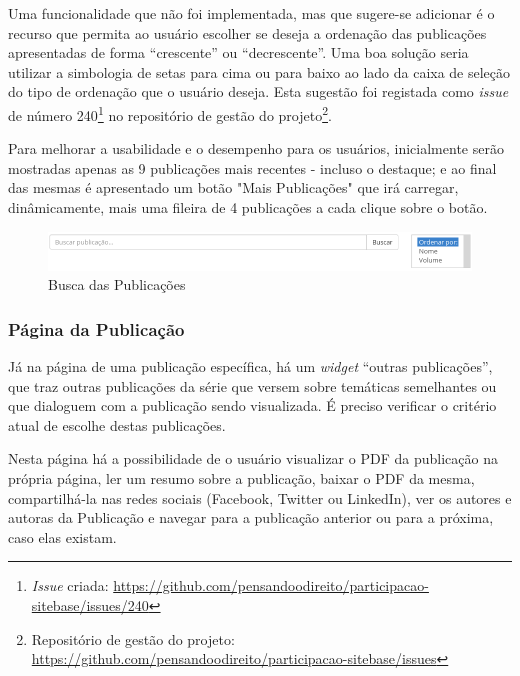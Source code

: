 Uma funcionalidade que não foi implementada, mas que sugere-se adicionar é o recurso que permita ao usuário escolher se deseja a ordenação das publicações apresentadas de forma ``crescente'' ou ``decrescente''. Uma boa solução seria utilizar a simbologia de setas para cima ou para baixo ao lado da caixa de seleção do tipo de ordenação que o usuário deseja. Esta sugestão foi registada como \textit{issue} de número 240\footnote{\textit{Issue} criada: \url{https://github.com/pensandoodireito/participacao-sitebase/issues/240}} no repositório de gestão do projeto\footnote{Repositório de gestão do projeto: \url{https://github.com/pensandoodireito/participacao-sitebase/issues}}.

Para melhorar a usabilidade e o desempenho para os usuários, inicialmente serão mostradas apenas as 9 publicações mais recentes - incluso o destaque; e ao final das mesmas é apresentado um botão "Mais Publicações" que irá carregar, dinâmicamente, mais uma fileira de 4 publicações a cada clique sobre o botão.

\begin{figure}[htb]%
	\begin{center}
		\includegraphics[scale=0.55]{./imagens/publicacoes-busca.png}%
	\end{center}%
	\caption{Busca das Publicações\label{fig:publicacoes-busca}}%
\end{figure}%

\subsubsection*{Página da Publicação}
Já na página de uma publicação específica, há um \textit{widget} ``outras publicações'', que traz outras publicações da série \ppod que versem sobre temáticas semelhantes ou que dialoguem com a publicação sendo visualizada. É preciso verificar o critério atual de escolhe destas publicações.

Nesta página há a possibilidade de o usuário visualizar o PDF da publicação na própria página, ler um resumo sobre a publicação, baixar o PDF da mesma, compartilhá-la nas redes sociais (Facebook, Twitter ou LinkedIn), ver os autores e autoras da Publicação e navegar para a publicação anterior ou para a próxima, caso elas existam.

